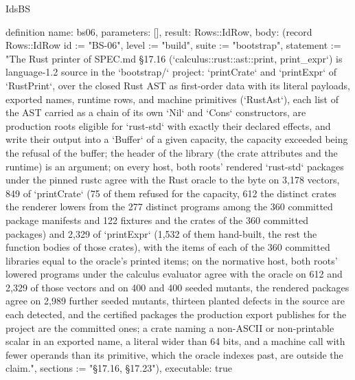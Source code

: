 \begin{lexlean}{IdsBS}
\begin{semanticmodule}
definition{
  name: bs06,
  parameters: [],
  result: Rows::IdRow,
  body: (record Rows::IdRow {id := "BS-06", level := "build", suite := "bootstrap", statement := "The Rust printer of SPEC.md §17.16 (`calculus::rust::ast::{print, print_expr}`) is language-1.2 source in the `bootstrap/` project: `printCrate` and `printExpr` of `RustPrint`, over the closed Rust AST as first-order data with its literal payloads, exported names, runtime rows, and machine primitives (`RustAst`), each list of the AST carried as a chain of its own `Nil` and `Cons` constructors, are production roots eligible for `rust-std` with exactly their declared effects, and write their output into a `Buffer` of a given capacity, the capacity exceeded being the refusal of the buffer; the header of the library (the crate attributes and the runtime) is an argument; on every host, both roots' rendered `rust-std` packages under the pinned rustc agree with the Rust oracle to the byte on 3,178 vectors, 849 of `printCrate` (75 of them refused for the capacity, 612 the distinct crates the renderer lowers from the 277 distinct programs among the 360 committed package manifests and 122 fixtures and the crates of the 360 committed packages) and 2,329 of `printExpr` (1,532 of them hand-built, the rest the function bodies of those crates), with the items of each of the 360 committed libraries equal to the oracle's printed items; on the normative host, both roots' lowered programs under the calculus evaluator agree with the oracle on 612 and 2,329 of those vectors and on 400 and 400 seeded mutants, the rendered packages agree on 2,989 further seeded mutants, thirteen planted defects in the source are each detected, and the certified packages the production export publishes for the project are the committed ones; a crate naming a non-ASCII or non-printable scalar in an exported name, a literal wider than 64 bits, and a machine call with fewer operands than its primitive, which the oracle indexes past, are outside the claim.", sections := "§17.16, §17.23"}),
  executable: true
}


\end{semanticmodule}
\end{lexlean}

